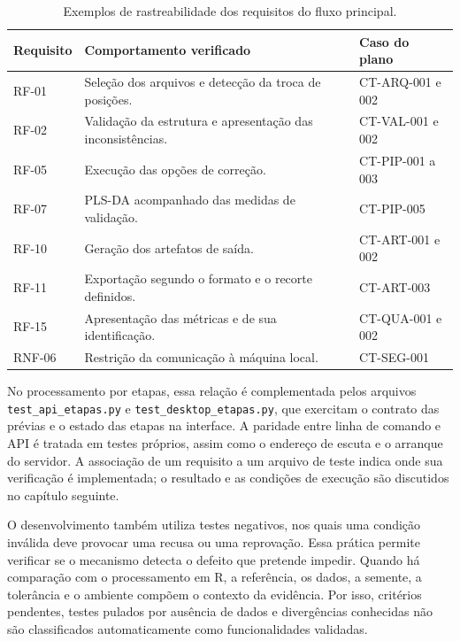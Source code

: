 \begin{table}[htbp]
\centering
\caption{Exemplos de rastreabilidade dos requisitos do fluxo principal.}
\label{tab:4-rastreabilidade}
\small
\begin{tabularx}{\textwidth}{|l|X|l|}
\hline
\textbf{Requisito} & \textbf{Comportamento verificado} & \textbf{Caso do plano} \\ \hline
RF-01 & Seleção dos arquivos e detecção da troca de posições. & CT-ARQ-001 e 002 \\ \hline
RF-02 & Validação da estrutura e apresentação das inconsistências. & CT-VAL-001 e 002 \\ \hline
RF-05 & Execução das opções de correção. & CT-PIP-001 a 003 \\ \hline
RF-07 & PLS-DA acompanhado das medidas de validação. & CT-PIP-005 \\ \hline
RF-10 & Geração dos artefatos de saída. & CT-ART-001 e 002 \\ \hline
RF-11 & Exportação segundo o formato e o recorte definidos. & CT-ART-003 \\ \hline
RF-15 & Apresentação das métricas e de sua identificação. & CT-QUA-001 e 002 \\ \hline
RNF-06 & Restrição da comunicação à máquina local. & CT-SEG-001 \\ \hline
\end{tabularx}
\par{}
\end{table}

No processamento por etapas, essa relação é complementada pelos arquivos \texttt{test\_\allowbreak{}api\_\allowbreak{}etapas.py} e \texttt{test\_\allowbreak{}desktop\_\allowbreak{}etapas.py}, que exercitam o contrato das prévias e o estado das etapas na interface. A paridade entre linha de comando e API é tratada em testes próprios, assim como o endereço de escuta e o arranque do servidor. A associação de um requisito a um arquivo de teste indica onde sua verificação é implementada; o resultado e as condições de execução são discutidos no capítulo seguinte.

O desenvolvimento também utiliza testes negativos, nos quais uma condição inválida deve provocar uma recusa ou uma reprovação. Essa prática permite verificar se o mecanismo detecta o defeito que pretende impedir. Quando há comparação com o processamento em R, a referência, os dados, a semente, a tolerância e o ambiente compõem o contexto da evidência. Por isso, critérios pendentes, testes pulados por ausência de dados e divergências conhecidas não são classificados automaticamente como funcionalidades validadas.

